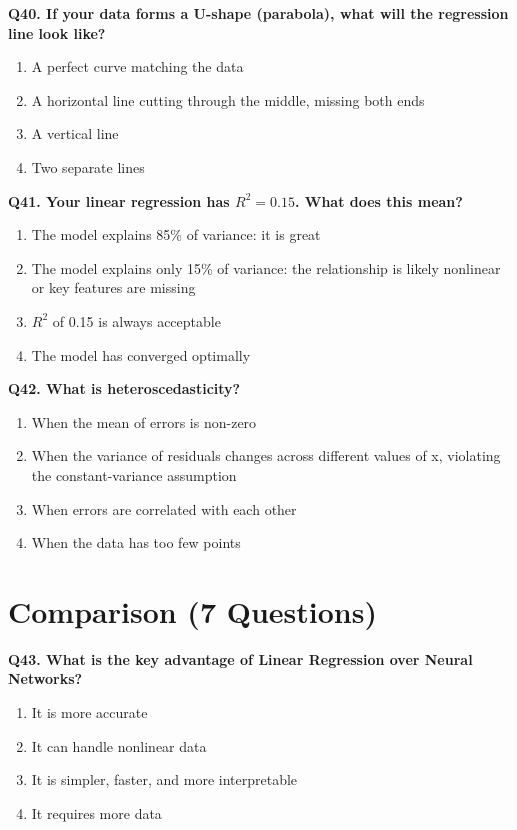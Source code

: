 \documentclass[12pt, a4paper]{article}
\newcommand{\question}[1]{\vspace{0.6em}\noindent\textbf{#1}}
\begin{document}
\question{Q40. If your data forms a U-shape (parabola), what will the regression line look like?}
\begin{enumerate}[label=\alph*)]
    \item A perfect curve matching the data
    \item A horizontal line cutting through the middle, missing both ends
    \item A vertical line
    \item Two separate lines
\end{enumerate}

\question{Q41. Your linear regression has $R^2 = 0.15$. What does this mean?}
\begin{enumerate}[label=\alph*)]
    \item The model explains 85\% of variance: it is great
    \item The model explains only 15\% of variance: the relationship is likely nonlinear or key features are missing
    \item $R^2$ of 0.15 is always acceptable
    \item The model has converged optimally
\end{enumerate}

\question{Q42. What is heteroscedasticity?}
\begin{enumerate}[label=\alph*)]
    \item When the mean of errors is non-zero
    \item When the variance of residuals changes across different values of x, violating the constant-variance assumption
    \item When errors are correlated with each other
    \item When the data has too few points
\end{enumerate}

\section{Comparison (7 Questions)}

\question{Q43. What is the key advantage of Linear Regression over Neural Networks?}
\begin{enumerate}[label=\alph*)]
    \item It is more accurate
    \item It can handle nonlinear data
    \item It is simpler, faster, and more interpretable
    \item It requires more data
\end{enumerate}
\end{document}
